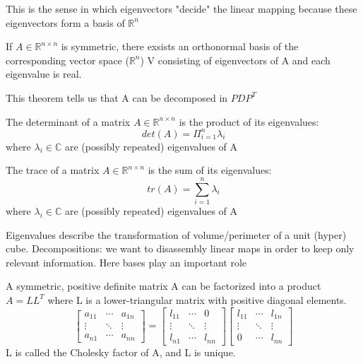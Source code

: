 This is the sense in which eigenvectors "decide" the linear mapping because these eigenvectors form a basis of $\mathbb{R}^{n}$
\begin{theorem}
    If $A \in \mathbb{R}^{n\times n}$ is symmetric, there exsists an orthonormal basis of the corresponding vector space ($\mathbb{R}^n$) V consisting of eigenvectors of A and each eigenvalue is real. 
\end{theorem}
This theorem tells us that A can be decomposed in $PDP^T$
\begin{theorem}
    The determinant of a matrix $A \in \mathbb{R}^{n\times n}$ is the product of its eigenvalues:
    \[ 
        det(A) = \Pi_{i=1}^{n}{\lambda_i} 
    \]
    where $\lambda_i \in \mathbb{C}$ are (possibly repeated) eigenvalues of A
\end{theorem}
\begin{theorem}
    The trace of a matrix $A \in \mathbb{R}^{n\times n}$ is the sum of its eigenvalues:
    \[ 
         tr(A) = \sum_{i=1}^{n}{\lambda_i}
    \]
    where $\lambda_i \in \mathbb{C}$ are (possibly repeated) eigenvalues of A
\end{theorem}
Eigenvalues describe the transformation of volume/perimeter of a unit (hyper) cube.
Decompositions: we want to disassembly linear maps in order to keep only relevant information. Here bases play an important role
\begin{theorem}
    A symmetric, positive definite matrix A can be factorized into a product $A = LL^T$ where L is a lower-triangular matrix with positive diagonal elements.
    \[ 
        \begin{bmatrix}
            a_{11} & \cdots & a_{1n} \\
            \vdots & \ddots & \vdots \\
            a_{n1} & \cdots & a_{nn} 
        \end{bmatrix} = \begin{bmatrix}
            l_{11} & \cdots & 0 \\
            \vdots & \ddots & \vdots \\
            l_{n1} & \cdots & l_{nn} 
        \end{bmatrix} \begin{bmatrix}
            l_{11} & \cdots & l_{1n} \\
            \vdots & \ddots & \vdots \\
            0 & \cdots & l_{nn} 
        \end{bmatrix} 
    \]
    L is called the Cholesky factor of A, and L is unique.
\end{theorem}
